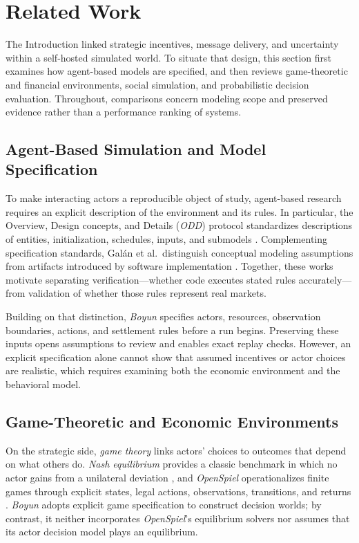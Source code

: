 \section{Related Work}\label{sec:related}
The Introduction linked strategic incentives, message delivery, and uncertainty
within a self-hosted simulated world. To situate that design, this section
first examines how agent-based models are specified, and then reviews
game-theoretic and financial environments, social simulation, and probabilistic
decision evaluation. Throughout, comparisons concern modeling scope and
preserved evidence rather than a performance ranking of systems.

\subsection{Agent-Based Simulation and Model Specification}
To make interacting actors a reproducible object of study, agent-based research
requires an explicit description of the environment and its rules. In
particular, the Overview, Design concepts, and Details (\textit{ODD}) protocol
standardizes descriptions of entities, initialization, schedules, inputs, and
submodels \cite{grimm2020}. Complementing specification standards,
Gal\'an et al.\ distinguish conceptual modeling assumptions from artifacts
introduced by software implementation \cite{galan2009}. Together, these works
motivate separating verification---whether code executes stated rules
accurately---from validation of whether those rules represent real markets.

Building on that distinction, \textit{Boyun} specifies actors,
resources, observation boundaries, actions, and settlement rules before a run
begins. Preserving these inputs opens assumptions to review and enables exact
replay checks. However, an explicit specification alone cannot show that
assumed incentives or actor choices are realistic, which requires examining
both the economic environment and the behavioral model.

\subsection{Game-Theoretic and Economic Environments}
On the strategic side, \textit{game theory} links actors' choices to
outcomes that depend on what others do. \textit{Nash equilibrium} provides a
classic benchmark in which no actor gains from a unilateral deviation
\cite{nash1950}, and \textit{OpenSpiel} operationalizes finite games through
explicit states, legal actions, observations, transitions, and returns
\cite{lanctot2019}. \textit{Boyun} adopts explicit game specification to
construct decision worlds; by contrast, it neither incorporates
\textit{OpenSpiel}'s equilibrium solvers nor assumes that its actor decision
model plays an equilibrium.

